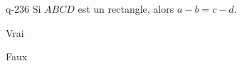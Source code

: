 \begin{truefalse}{q-236}
Si $ABCD$ est un rectangle, alors $a-b=c-d$.
\item Vrai
\item* Faux
\end{truefalse}

